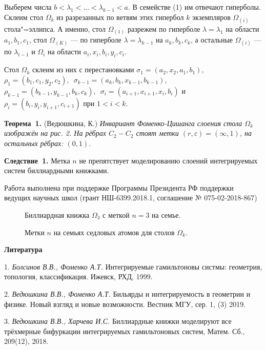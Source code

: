 Выберем числа $b < \lambda_1 < \dots < \lambda_{k-1} < a$. В семействе (1) им отвечают гиперболы. Склеим стол $\Omega_k$ из разрезанных по ветвям этих гипербол $k$ экземпляров $\Omega_{(i)}$ стола"=эллипса. А именно, стол $\Omega_{(1)}$ разрежем по гиперболе $\lambda = \lambda_1$ на области $a_1, b_1, c_1$, стол $\Omega_{(K)}$ --- по гиперболе $\lambda = \lambda_{k-1}$ на $a_k, b_k, c_k$, а остальные $\Omega_{(i)}$ --- по $\lambda_{i-1}$ и $\Omega_i$ на области $a_i, x_i, b_i, y_i, c_i$.

Стол $\Omega_k$ склеим из них с перестановками $\sigma_1 = (a_2, x_2, a_1, b_1),$\, $\rho_1 = (b_1, c_1, y_2, c_2),$\, $\sigma_{k-1} = (a_{k}, b_{k}, x_{k-1}, b_{k-1}) ,$\, $\rho_{k-1} = (b_{k-1}, y_{k-1}, b_{k}, c_{k}),$\, $\sigma_i = (a_{i+1}, x_{i+1}, x_i, b_i)$ и $\rho_i = (b_{i}, y_{i}, y_{i+1}, c_{i+1})$ при $1 < i < k$.

\textbf{Теорема~1.} (Ведюшкина, К.) {\it Инвариант Фоменко-Цишанга слоения стола $\Omega_k$ изображён на рис. 2. На рёбрах $C_2 - C_2$ стоят метки $(r, \varepsilon) = (\infty, 1)$, на остальных рёбрах: $(0, 1)$.}

\textbf{Следствие~1.} Метка $n$ не препятствует моделированию слоений интегрируемых систем биллиардными книжками.

Работа выполнена при поддержке Программы Президента РФ поддержки ведущих научных школ (грант НШ-6399.2018.1, соглашение № 075-02-2018-867)




 \begin{figure}[h!]
\caption{Биллиардная книжка $\Omega_3$ с меткой $n = 3$ на семье.} \label{WildMol}
 \end{figure}


 \begin{figure}[h!]
\caption{Метки $n$ на семьях седловых атомов для столов $\Omega_k$.} \label{WildMol}
 \end{figure}









\smallskip \centerline {\bf Литература} \nopagebreak

1. {\it Болсинов В.В., Фоменко А.Т.} Интегрируемые гамильтоновы систмы: геометрия, топология, классификация. Ижевск, РХД, 1999.


2. {\it Ведюшкина В.В., Фоменко А.Т.} Бильярды и интегрируемость в геометрии и физике. Новый взгляд и новые возможности. Вестник МГУ, сер. 1, (3) 2019.

3. {\it Ведюшкина В.В., Харчева И.С.} Биллиардные книжки моделируют все трёхмерные бифуркации интегрируемых гамильтоновых систем, Матем. Сб., 209(12), 2018.

